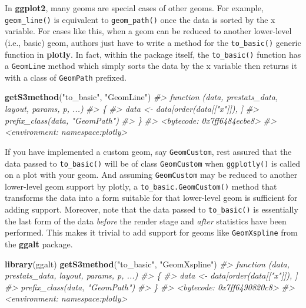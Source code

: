 \documentclass[
  12pt,
]{krantz}
\newenvironment{Shaded}{\begin{snugshade}}{\end{snugshade}}
\newcommand{\CommentTok}[1]{\textcolor[rgb]{0.56,0.35,0.01}{\textit{#1}}}
\newcommand{\KeywordTok}[1]{\textcolor[rgb]{0.13,0.29,0.53}{\textbf{#1}}}
\newcommand{\NormalTok}[1]{#1}
\newcommand{\StringTok}[1]{\textcolor[rgb]{0.31,0.60,0.02}{#1}}
\begin{document}
In \textbf{ggplot2}, many geoms are special cases of other geoms. For example, \texttt{geom\_line()} is equivalent to \texttt{geom\_path()} once the data is sorted by the x variable. For cases like this, when a geom can be reduced to another lower-level (i.e., basic) geom, authors just have to write a method for the \texttt{to\_basic()} generic function in \textbf{plotly}. In fact, within the package itself, the \texttt{to\_basic()} function has a \texttt{GeomLine} method which simply sorts the data by the x variable then returns it with a class of \texttt{GeomPath} prefixed.

\begin{Shaded}
\begin{Highlighting}[]
\KeywordTok{getS3method}\NormalTok{(}\StringTok{"to_basic"}\NormalTok{, }\StringTok{"GeomLine"}\NormalTok{)}
\CommentTok{#> function (data, prestats_data, layout, params, p, ...) }
\CommentTok{#> \{}
\CommentTok{#>     data <- data[order(data[["x"]]), ]}
\CommentTok{#>     prefix_class(data, "GeomPath")}
\CommentTok{#> \}}
\CommentTok{#> <bytecode: 0x7ff6484ecbe8>}
\CommentTok{#> <environment: namespace:plotly>}
\end{Highlighting}
\end{Shaded}

If you have implemented a custom geom, say \texttt{GeomCustom}, rest assured that the data passed to \texttt{to\_basic()} will be of class \texttt{GeomCustom} when \texttt{ggplotly()} is called on a plot with your geom. And assuming \texttt{GeomCustom} may be reduced to another lower-level geom support by plotly, a \texttt{to\_basic.GeomCustom()} method that transforms the data into a form suitable for that lower-level geom is sufficient for adding support. Moreover, note that the data passed to \texttt{to\_basic()} is essentially the last form of the data \emph{before} the render stage and \emph{after} statistics have been performed. This makes it trivial to add support for geoms like \texttt{GeomXspline} from the \textbf{ggalt} package.

\begin{Shaded}
\begin{Highlighting}[]
\KeywordTok{library}\NormalTok{(ggalt)}
\KeywordTok{getS3method}\NormalTok{(}\StringTok{"to_basic"}\NormalTok{, }\StringTok{"GeomXspline"}\NormalTok{)}
\CommentTok{#> function (data, prestats_data, layout, params, p, ...) }
\CommentTok{#> \{}
\CommentTok{#>     data <- data[order(data[["x"]]), ]}
\CommentTok{#>     prefix_class(data, "GeomPath")}
\CommentTok{#> \}}
\CommentTok{#> <bytecode: 0x7ff6490820c8>}
\CommentTok{#> <environment: namespace:plotly>}
\end{Highlighting}
\end{Shaded}
\end{document}
